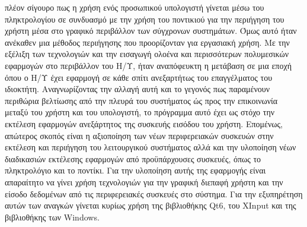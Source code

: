 



πλέον σίγουρο πως η χρήση ενός προσωπικού υπολογιστή γίνεται μέσω του
πληκτρολογίου σε συνδυασμό με την χρήση του ποντικιού για την περιήγηση του
χρήστη μέσα στο γραφικό περιβάλλον των σύγχρονων συστημάτων. Όμως αυτό ήταν
ανέκαθεν μια μέθοδος περιήγησης που προορίζονταν για εργασιακή χρήση. Με την
εξέλιξη των τεχνολογιών και την εισαγωγή ολοένα και περισσότερων πολυμεσικών
εφαρμογών στο περιβάλλον του Η/Υ, ήταν αναπόφευκτη η μετάβαση σε μια εποχή
όπου ο Η/Υ έχει εφαρμογή σε κάθε σπίτι ανεξαρτήτως του επαγγέλματος του
ιδιοκτήτη. Αναγνωρίζοντας την αλλαγή αυτή και το γεγονός πως παραμένουν
περιθώρια βελτίωσης από την πλευρά του συστήματος ώς προς την επικοινωνία
μεταξύ του χρήστη και του υπολογιστή, το πρόγραμμα αυτό έχει ως στόχο την
εκτέλεση εφαρμογών ανεξάρτητος της συσκευής εισόδου του χρήστη. Επομένως,
απώτερος σκοπός είναι η αξιοποίηση των νέων περιφερειακών συσκευών στην
εκτέλεση και περιήγηση του λειτουργικού συστήματος αλλά και την υλοποίηση
νέων διαδικασιών εκτέλεσης εφαρμογών από προϋπάρχουσες συσκευές, όπως το
πληκτρολόγιο και το ποντίκι. Για την υλοποίηση αυτής της εφαρμογής είναι
απαραίτητο να γίνει χρήση τεχνολογιών για την γραφική διεπαφή χρήστη και την
είσοδο δεδομένων από τις περιφερειακές συσκευές στο σύστημα. Για την
εξυπηρέτηση αυτών των αναγκών γίνεται κυρίως χρήση της βιβλιοθήκης Qt6, του
XInput και της βιβλιοθήκης των Windows.






